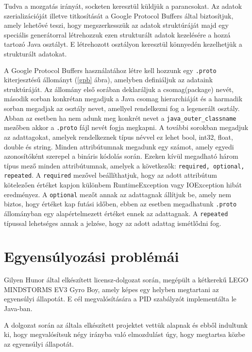 Tudva a mozgatás irányát, socketen keresztül küldjük a parancsokat. Az adatok szerializációját illetve titkosítását a Google Protocol Buffers által biztosítjuk, amely lehetővé teszi, hogy megszerkesszük az adatok struktúráját majd egy speciális generátorral létrehozzuk ezen strukturált adatok kezelésére a hozzá tartozó Java osztályt. E létrehozott osztályon keresztül könnyedén kezelhetjük a strukturált adatokat.

A Google Protocol Buffers használatához létre kell hozzunk egy \texttt{.proto} kiterjesztésű állományt (\ref{gpb} ábra), amelyben definiáljuk az adataink struktúráját. Az állomány első sorában deklaráljuk a csomag(package) nevét, második sorban konkrétan megadjuk a Java csomag hierarchiáját és a harmadik sorban megadjak az osztály nevet, amellyel rendelkezni fog a legenerált osztály. Abban az esetben ha nem adunk meg konkrét nevet a \texttt{java\_outer\_classname} mezőben akkor a \texttt{.proto} fájl nevét fogja megkapni. A további sorokban megadjuk az adattagokat, amelyek rendelkeznek típus névvel ez lehet bool, int32, float, double és string. Minden attribútumnak megadunk egy számot, amely egyedi azonosítóként szerepel a bináris kódolás során. Ezeken kívül megadható három típus mező minden attribútumnak, amelyek a következők: \texttt{required, optional, repeated}. A \texttt{required} mezővel beállíthatjuk, hogy az adott attribútum kötelezően értéket kapjon különbem RuntimeException vagy IOException hibát eredményez.  A \texttt{optional} mezőt annak az adattagnak állítjuk be, amely nem biztos, hogy értéket kap futási időben, ebben az esetben megadhatunk \texttt{.proto} állományban egy alapértelmezett értéket ennek az adattagnak. A \texttt{repeated} típussal lehetséges annak a jelzése, hogy az adott adattag ismétlődni fog.



\section{Egyensúlyozási problémái}\label{sec:MEGVALOSITAS:pidModositas}

Gilyen Hunor által elkészített licensz-dolgozat során, megépült a kétkerekű LEGO MINDSTORMS EV3 Gyro Boy, amely képes egy helyben megtartani az egyensúlyi állapotát. E cél megvalósítására a PID szabályzót implementálta le Java-ban.

A dolgozat során az általa elkészített projektet vettük alapnak és ebből indultunk ki, hogy megvalósítsuk négy irányba való elmozdulást úgy, hogy megtartsa közbe az egyensúlyi állapotát.

